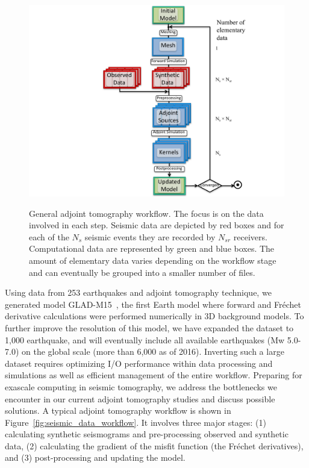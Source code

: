 \begin{figure}
  \begin{center}
  \includegraphics[width=\columnwidth]{ch-workflow/figures/seismic_data_workflow.pdf}
  \caption[General adjoint tomography workflow]
    {General adjoint tomography workflow. The focus is on the data
involved in each step. Seismic data are depicted by red boxes and for each of
the $N_{s}$ seismic events they are recorded by $N_{sr}$ receivers.
Computational data are represented by green and blue boxes. The amount of
elementary data varies depending on the workflow stage and can eventually be
grouped into a smaller number of files.}
  \label{fig:seismic_data_workflow}
  \label{default}
  \end{center}
\end{figure}
%

Using data from 253 earthquakes and adjoint tomography technique, we generated model
GLAD-M15~\cite{bozdaug2016global}, the first Earth model where forward and Fr\'echet
derivative calculations were performed numerically in 3D background models.  To
further improve the resolution of this model, we have expanded the dataset to
1,000 earthquake, and will eventually include all available earthquakes (Mw
5.0-7.0) on the global scale (more than 6,000 as of 2016). Inverting 
such a large dataset requires optimizing I/O
performance within data processing and simulations as well as efficient management
of the entire workflow. Preparing for exascale computing in seismic
tomography, we address the bottlenecks we encounter in our current adjoint
tomography studies and discuss possible solutions. A
typical adjoint tomography workflow is shown in
Figure~\ref{fig:seismic_data_workflow}.
It involves three major
stages: (1) calculating synthetic seismograms and pre-processing observed and synthetic data, 
(2) calculating the gradient of the misfit function
(the Fr\'echet derivatives), and (3) post-processing and updating the model.

